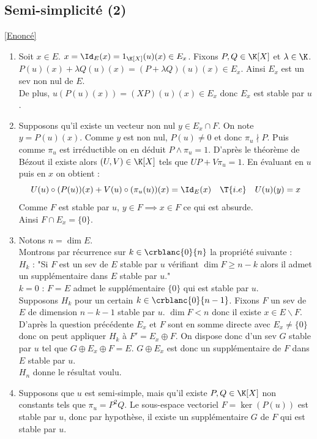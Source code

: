 \documentclass[8pt]{book}
\begin{document}
	\subsection{Semi-simplicité (2) }
	\label{Semi-simplicité (2) corrigé}
	\textcolor{blue}{\hyperref[Semi-simplicité (2)]{[Enoncé]}}\\
	\begin{enumerate}[leftmargin=*]
		\item Soit $x\in E$. $x=\Id_E(x)=1_\K[X](u)(x)\in E_x$. Fixons $P,Q\in \K[X]$ et $\lambda\in \K$.\\
		$P(u)(x)+\lambda Q(u)(x)=(P+\lambda Q)(u)(x)\in E_x$. Ainsi $E_x$ est un sev non nul de $E$.\\
		De plus, $u(P(u)(x))=(XP)(u)(x)\in E_x$ donc $E_x$ est stable par $u$.
		\item Supposons qu'il existe un vecteur non nul $y\in E_x\cap F$. On note $y=P(u)(x)$. Comme $y$ est non nul, $P(u)\ne 0$ et donc $\pi_u\nmid P$. Puis comme $\pi_u$ est irréductible on en déduit $P\wedge \pi_u=1$. D'après le théorème de Bézout il existe alors $(U,V)\in \K[X]$ tels que $UP+V\pi_u=1$. En évaluant en $u$ puis en $x$ on obtient :
		$$U(u)\circ(P(u))(x)+V(u)\circ(\pi_u(u))(x)=\Id_E(x)\quad\T{i.e}\quad U(u)(y)=x$$
		Comme $F$ est stable par $u$, $y\in F\implies x\in F$ ce qui est absurde.\\
		Ainsi $F\cap E_x=\{0\}$.
		\item Notons $n=\dim E$.\\
		Montrons par récurrence sur $k\in \crblanc{0}{n}$ la propriété suivante :\\
		$H_k$ : "Si $F$ est un sev de $E$ stable par $u$ vérifiant $\dim F\geq n-k$ alors il admet un supplémentaire dans $E$ stable par $u$."\\
		$k=0$ : $F=E$ admet le supplémentaire $\{0\}$ qui est stable par $u$.\\
		Supposons $H_k$ pour un certain $k\in \crblanc{0}{n-1}$. Fixons $F$ un sev de $E$ de dimension $n-k-1$ stable par $u$. $\dim F<n$ donc il existe $x\in E\backslash F$. D'après la question précédente $E_x$ et $F$ sont en somme directe avec $E_x\ne\{0\}$ donc on peut appliquer $H_k$ à $F'=E_x\oplus F$. On dispose donc d'un sev $G$ stable par $u$ tel que $G\oplus E_x\oplus F=E$. $G\oplus E_x$ est donc un supplémentaire de $F$ dans $E$ stable par $u$.\\
		$H_n$ donne le résultat voulu.
		\item Supposons que $u$ est semi-simple, mais qu’il existe $P,Q\in \K[X]$ non constants tels que $\pi_u=P^2Q$. Le sous-espace vectoriel $F=\ker(P(u))$ est stable par $u$, donc par hypothèse, il existe un supplémentaire $G$ de $F$ qui est stable par $u$.\\

\end{enumerate}
\end{document}
